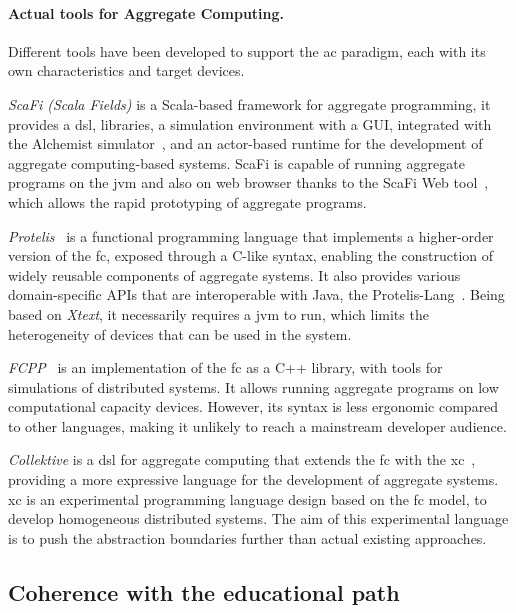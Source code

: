 \documentclass[12pt, a4paper]{article}
\begin{document}
\sloppypar
\paragraph{Actual tools for Aggregate Computing.}

Different tools have been developed to support the \ac{ac} paradigm,
each with its own characteristics and target devices.

\emph{ScaFi (Scala Fields)}\cite{scafi} is a Scala-based framework for aggregate programming,
it provides a \ac{dsl}, libraries, a simulation environment with a GUI,
integrated with the Alchemist simulator~\cite{PianiniJOS2013},
and an actor-based runtime for the development of aggregate computing-based systems.
%
ScaFi is capable of running aggregate programs on the \ac{jvm} and also on web browser thanks to the ScaFi Web tool~\cite{Coordination2021-scafiweb},
which allows the rapid prototyping of aggregate programs.

\emph{Protelis}~\cite{PianiniSAC2015} is a functional programming language that implements a higher-order version of the \ac{fc},
exposed through a C-like syntax,
enabling the construction of widely reusable components of aggregate systems.
%
It also provides various domain-specific APIs that are interoperable with Java, the Protelis-Lang~\cite{SASO2017-protelislang}.
%
Being based on \emph{Xtext},
it necessarily requires a \ac{jvm} to run,
which limits the heterogeneity of devices that can be used in the system.

\emph{FCPP}~\cite{DBLP:journals/scp/AudritoT24} is an implementation of the \ac{fc} as a C++ library,
with tools for simulations of distributed systems.
%
It allows running aggregate programs on low computational capacity devices.
%
However,
its syntax is less ergonomic compared to other languages,
making it unlikely to reach a mainstream developer audience.

\emph{Collektive} is a \ac{dsl} for aggregate computing that extends the \ac{fc} with the \ac{xc}~\cite{AudritoCDSV24},
providing a more expressive language for the development of aggregate systems.
%
\ac{xc} is an experimental programming language design based on the \ac{fc} model,
to develop homogeneous distributed systems.
%
The aim of this experimental language is to push the abstraction boundaries further than actual existing approaches.

\subsection{Coherence with the educational path}\label{subsec:coherence-with-the-educational-path}
\end{document}
